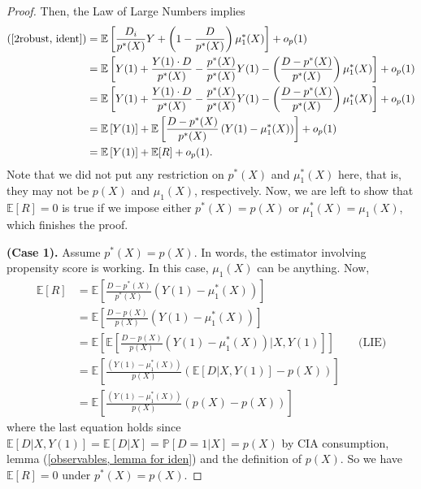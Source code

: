 \documentclass[11pt,a4paper]{amsart}
\theoremstyle{plain}
\theoremstyle{definition}
\begin{document}
\begin{proof}
	Then, the Law of Large Numbers implies
	\[	\begin{aligned}
		(\ref{2robust, ident}) &= \mathbb{E}\left[\frac{D_{i}}{p^{*}(X)} Y + \left(1- \frac{D}{p^{*}(X)}\right) \mu_{1}^{*}(X)  \right] + o_{p}(1) \\
		&= \mathbb{E}\left[ Y(1) + \frac{Y(1) \cdot D}{p^{*}(X)} - \frac{p^{*}(X)}{p^{*}(X)}Y(1) - \left( \frac{D-p^{*}(X)}{p^{*}(X)}\right) \mu_{1}^{*}(X)  \right] + o_{p}(1) \\
		&= \mathbb{E}\left[ Y(1) + \frac{Y(1) \cdot D}{p^{*}(X)} - \frac{p^{*}(X)}{p^{*}(X)}Y(1) - \left( \frac{D-p^{*}(X)}{p^{*}(X)}\right) \mu_{1}^{*}(X)  \right] + o_{p}(1) \\
		&= \mathbb{E}\left[ Y(1)\right] +  \mathbb{E}\left[\frac{ D-p^{*}(X)}{p^{*}(X)} \left(Y(1)-\mu_{1}^{*}(X)\right)  \right] + o_{p}(1) \\
		&= \mathbb{E}\left[ Y(1)\right] + \mathbb{E}[R]  + o_{p}(1).
	\end{aligned}	\]
	Note that we did not put any restriction on $p^{*}(X)$ and $\mu_{1}^{*}(X)$ here, that is, they may not be  $p(X)$ and $\mu_{1}(X)$, respectively. Now, we are left to show that $\mathbb{E}[R]  = 0$ is true if we impose either $p^{*}(X) = p(X)$ or  $\mu_{1}^{*}(X) = \mu_{1}(X)$, which finishes the proof. \par 						
	\textbf{(Case 1).} Assume $p^{*}(X) = p(X)$. In words, the estimator involving propensity score is working. In this case, $\mu_{1}(X)$ can be anything. Now, 
	\[	 \begin{aligned}
		\mathbb{E}[R]  &= \mathbb{E}\left[\frac{ D-p^{*}(X)}{p^{*}(X)} \left(Y(1)-\mu_{1}^{*}(X)\right)  \right]	\\
		&= \mathbb{E}\left[\frac{ D-p(X)}{p(X)} \left(Y(1)-\mu_{1}^{*}(X)\right)  \right]\\
		&= \mathbb{E}\left[\mathbb{E}\left[\frac{ D-p(X)}{p(X)} \left(Y(1)-\mu_{1}^{*}(X)\right) \big| X, Y(1)\right]  \right] &&\text{(LIE)} \\
		&= \mathbb{E}\left[ \frac{\left(Y(1)-\mu_{1}^{*}(X)\right)}{p(X)} \left(\mathbb{E} \left[ D\big| X, Y(1)\right]- p(X) \right) \right] \\
		&=  \mathbb{E}\left[ \frac{\left(Y(1)-\mu_{1}^{*}(X)\right)}{p(X)} \left(p(X)-p(X) \right) \right]
	\end{aligned} \]
	where the last equation holds since $ \mathbb{E} \left[ D\big| X, Y(1)\right] =  \mathbb{E} \left[ D\big| X\right] = \mathbb{P}[D=1|X] = p(X)$ by CIA consumption, lemma (\ref{observables, lemma for iden}) and the definition of $p(X)$. So we have $	\mathbb{E}[R]  = 0$ under $p^{*}(X) = p(X)$.\par 
	

\end{proof}
\end{document}
